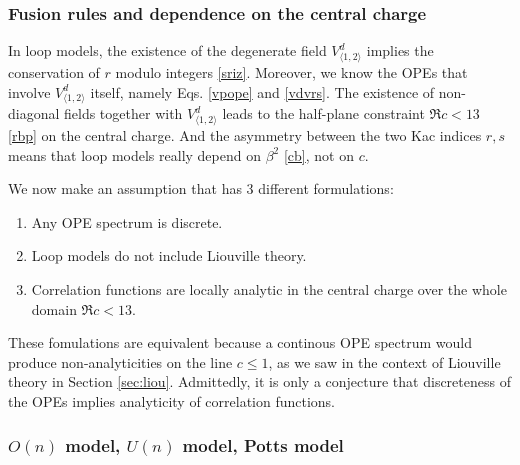 \documentclass[12pt, a4paper]{article}
\theoremstyle{break}
\begin{document}
\subsubsection{Fusion rules and dependence on the central charge}

In loop models, the existence of the degenerate field $V^d_{\langle 1,2\rangle}$ implies the conservation of $r$ modulo integers \eqref{sriz}. Moreover, we know the OPEs that involve $V^d_{\langle 1,2\rangle}$ itself, namely Eqs. \eqref{vpope} and \eqref{vdvrs}. The existence of non-diagonal fields together with $V^d_{\langle 1,2\rangle}$ leads to the half-plane constraint $\Re c<13$ \eqref{rbp} on the central charge. And the asymmetry between the two Kac indices $r,s$ means that loop models really depend on $\beta^2$ \eqref{cb}, not on $c$. 

We now make an assumption that has 3 different formulations:
\begin{enumerate}
 \item Any OPE spectrum is discrete.
 \item Loop models do not include Liouville theory. 
 \item Correlation functions are locally analytic in the central charge over the whole domain $\Re c<13$.
\end{enumerate}
These fomulations are equivalent because a continous OPE spectrum would produce non-analyticities on the line $c\leq 1$, as we saw in the context of Liouville theory in Section \ref{sec:liou}. Admittedly, it is only a conjecture that discreteness of the OPEs implies analyticity of correlation functions.


\subsubsection{$O(n)$ model, $U(n)$ model, Potts model}\label{sec:models}
\end{document}
